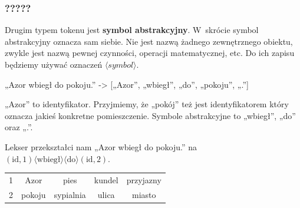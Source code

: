 \documentclass[10pt,t]{beamer}
\begin{document}
\begin{frame}
  \frametitle{?????}


  Drugim typem tokenu jest \textbf{symbol abstrakcyjny}. W~skrócie symbol
  abstrakcyjny oznacza sam siebie. Nie jest nazwą żadnego zewnętrznego
  obiektu, zwykle jest nazwą pewnej czynności, operacji matematycznej, etc.
  Do ich zapisu będziemy używać oznaczeń $\langle symbol \rangle$.

  „Azor wbiegł do pokoju.” -> [„Azor”, „wbiegł”, „do”, „pokoju”, „.”]

  „Azor” to identyfikator. Przyjmiemy, że „pokój” też jest identyfikatorem
  który oznacza jakieś konkretne pomieszczenie. Symbole abstrakcyjne to
  „wbiegł”, „do” oraz „.”.

  Lekser przekształci nam „Azor wbiegł do pokoju.” na \\
  $( \text{id}, 1 ) \langle \text{wbiegł} \rangle \langle \text{do} \rangle ( \text{id}, 2 )$.

  \begin{center}

    \begin{tabular}{|c|c|c|c|c|}

      \hline
      1 & Azor & pies & kundel & przyjazny \\
      2 & pokoju & sypialnia & ulica & miasto \\
      \hline
    \end{tabular}

  \end{center}

\end{frame}





\end{document}
